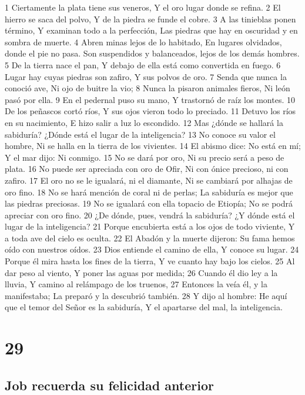 1 Ciertamente la plata tiene sus veneros,
Y el oro lugar donde se refina.
2 El hierro se saca del polvo,
Y de la piedra se funde el cobre.
3 A las tinieblas ponen término,
Y examinan todo a la perfección,
Las piedras que hay en oscuridad y en sombra de muerte. 
4 Abren minas lejos de lo habitado,
En lugares olvidados, donde el pie no pasa.
Son suspendidos y balanceados, lejos de los demás hombres.
5 De la tierra nace el pan,
Y debajo de ella está como convertida en fuego.
6 Lugar hay cuyas piedras son zafiro,
Y sus polvos de oro.
7 Senda que nunca la conoció ave,
Ni ojo de buitre la vio;
8 Nunca la pisaron animales fieros,
Ni león pasó por ella.
9 En el pedernal puso su mano,
Y trastornó de raíz los montes.
10 De los peñascos cortó ríos,
Y sus ojos vieron todo lo preciado.
11 Detuvo los ríos en su nacimiento,
E hizo salir a luz lo escondido.
12 Mas ¿dónde se hallará la sabiduría?
¿Dónde está el lugar de la inteligencia?
13 No conoce su valor el hombre,
Ni se halla en la tierra de los vivientes.
14 El abismo dice: No está en mí;
Y el mar dijo: Ni conmigo.
15 No se dará por oro,
Ni su precio será a peso de plata.
16 No puede ser apreciada con oro de Ofir,
Ni con ónice precioso, ni con zafiro.
17 El oro no se le igualará, ni el diamante,
Ni se cambiará por alhajas de oro fino.
18 No se hará mención de coral ni de perlas;
La sabiduría es mejor que las piedras preciosas.
19 No se igualará con ella topacio de Etiopía;
No se podrá apreciar con oro fino.
20 ¿De dónde, pues, vendrá la sabiduría?
¿Y dónde está el lugar de la inteligencia?
21 Porque encubierta está a los ojos de todo viviente,
Y a toda ave del cielo es oculta.
22 El Abadón y la muerte dijeron:
Su fama hemos oído con nuestros oídos.
23 Dios entiende el camino de ella,
Y conoce su lugar.
24 Porque él mira hasta los fines de la tierra,
Y ve cuanto hay bajo los cielos.
25 Al dar peso al viento,
Y poner las aguas por medida;
26 Cuando él dio ley a la lluvia,
Y camino al relámpago de los truenos,
27 Entonces la veía él, y la manifestaba;
La preparó y la descubrió también.
28 Y dijo al hombre:
He aquí que el temor del Señor es la sabiduría, 
Y el apartarse del mal, la inteligencia.

\chapter{29}

\section*{Job recuerda su felicidad anterior}


